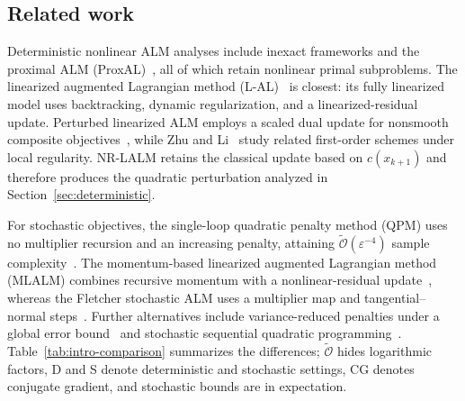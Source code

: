 \documentclass[11pt]{article}
\theoremstyle{definition}
\theoremstyle{remark}
\numberwithin{equation}{section}
\numberwithin{figure}{section}
\numberwithin{table}{section}
\numberwithin{algorithm}{section}
\newcommand{\cO}{\mathcal{O}}
\newcommand{\eps}{\varepsilon}
\begin{document}
\subsection{Related work}

Deterministic nonlinear ALM analyses include inexact frameworks
\cite{SahinEtAl2019,GrapigliaYuan2021,BirginMartinez2020} and the proximal ALM (ProxAL)~\cite{XieWright2021}, all of which retain nonlinear primal subproblems.  The linearized augmented Lagrangian method (L-AL)~\cite{BourkhissiNecoara2025} is closest: its fully linearized model uses backtracking, dynamic regularization, and a linearized-residual update. Perturbed linearized ALM employs a
scaled dual update for nonsmooth composite objectives~\cite{ElBourkhissiEtAl2025}, while Zhu and Li~\cite{ZhuLi2026} study related first-order schemes under local
regularity.  NR-LALM retains the classical update based on
$c(x_{k+1})$ and therefore produces the quadratic perturbation analyzed in Section~\ref{sec:deterministic}.

For stochastic objectives, the single-loop quadratic penalty method (QPM) uses no multiplier recursion and an increasing penalty, attaining $\widetilde{\cO}(\eps^{-4})$ sample complexity~\cite{AlacaogluWright2024}. The momentum-based linearized augmented Lagrangian method (MLALM) combines
recursive momentum with a nonlinear-residual update~\cite{ShiWangWang2025}, whereas the Fletcher stochastic ALM uses a multiplier map and tangential--normal steps~\cite{CuiEtAl2026}.  Further alternatives include
variance-reduced penalties under a global error bound~\cite{LuMeiXiao2026} and stochastic sequential quadratic programming~\cite{BerahasEtAl2021,CurtisONeillRobinson2024}.
Table~\ref{tab:intro-comparison} summarizes the differences;
$\widetilde{\cO}$ hides logarithmic factors, D and S denote deterministic and stochastic settings, CG denotes conjugate gradient, and stochastic bounds are in expectation.
\end{document}
